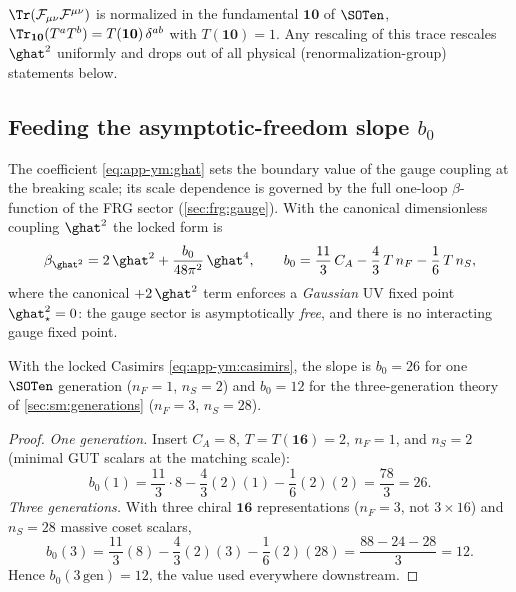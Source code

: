 \begin{remark}\label{rem:app-ym:norm}
$\Tr(\mathcal F_{\mu\nu}\mathcal F^{\mu\nu})$ is normalized in the
fundamental $\mathbf{10}$ of $\SOTen$, $\Tr_{\mathbf{10}}(T^{a}T^{b})
=T(\mathbf{10})\,\delta^{ab}$ with $T(\mathbf{10})=1$. Any rescaling of
this trace rescales $\ghat^{2}$ uniformly and drops out of all
physical (renormalization-group) statements below.
\end{remark}

\subsection{Feeding the asymptotic-freedom slope $b_{0}$}
\label{sec:app-ym:b0}

The coefficient \eqref{eq:app-ym:ghat} sets the boundary value of the
gauge coupling at the breaking scale; its scale dependence is governed
by the full one-loop $\beta$-function of the FRG sector
(\autoref{sec:frg:gauge}). With the canonical dimensionless coupling
$\ghat^{2}$ the locked form is
\begin{equation}\label{eq:app-ym:beta}
  \beta_{\ghat^{2}}
  =2\,\ghat^{2}+\frac{b_{0}}{48\pi^{2}}\,\ghat^{4},
  \qquad
  b_{0}=\frac{11}{3}\,C_{A}-\frac{4}{3}\,T\,n_{F}
        -\frac16\,T\,n_{S} ,
\end{equation}
where the canonical $+2\,\ghat^{2}$ term enforces a \emph{Gaussian} UV
fixed point $\ghat^{2}_{\star}=0$: the gauge sector is asymptotically
\emph{free}, and there is no interacting gauge fixed point.

\begin{theorem}
\label{thm:app-ym:b0}
With the locked Casimirs \eqref{eq:app-ym:casimirs}, the slope is
$b_{0}=26$ for one $\SOTen$ generation ($n_{F}=1$, $n_{S}=2$) and
$b_{0}=12$ for the three-generation theory of \autoref{sec:sm:generations}
($n_{F}=3$, $n_{S}=28$).
\end{theorem}

\begin{proof}
\emph{One generation.} Insert $C_{A}=8$, $T=T(\mathbf{16})=2$, $n_{F}=1$,
and $n_{S}=2$ (minimal GUT scalars at the matching scale):
\begin{equation}\label{eq:app-ym:b0one}
  b_{0}(1)
  =\frac{11}{3}\cdot 8-\frac43(2)(1)-\frac16(2)(2)
  =\frac{78}{3}=26 .
\end{equation}
\emph{Three generations.} With three chiral $\mathbf{16}$ representations
($n_{F}=3$, not $3\times16$) and $n_{S}=28$ massive coset scalars,
\begin{equation}\label{eq:app-ym:b0lin}
  b_{0}(3)
  =\frac{11}{3}(8)-\frac43(2)(3)-\frac16(2)(28)
  =\frac{88-24-28}{3}=12 .
\end{equation}
Hence $b_{0}(3\,\mathrm{gen})=12$, the value used everywhere downstream.
\end{proof}

